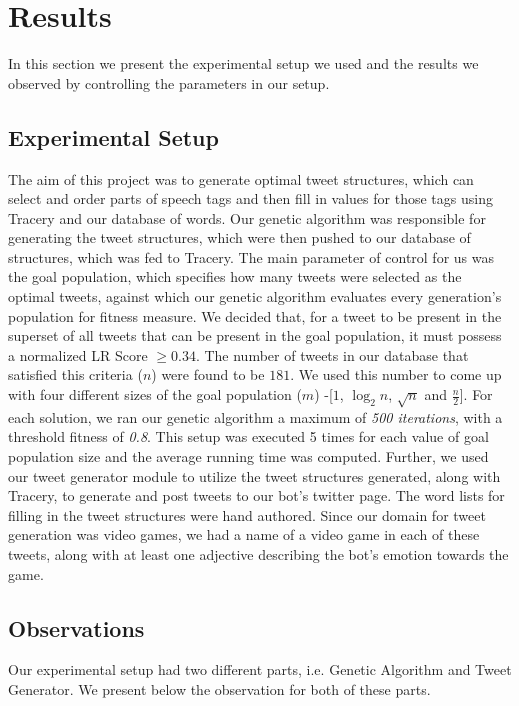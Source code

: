 \section{Results}
In this section we present the experimental setup we used and the results we observed by controlling the parameters in our setup.

\subsection{Experimental Setup}
The aim of this project was to generate optimal tweet structures, which can select and order parts of speech tags and then fill in values for those tags using Tracery and our database of words. Our genetic algorithm was responsible for generating the tweet structures, which were then pushed to our database of structures, which was fed to Tracery. The main parameter of control for us was the goal population, which specifies how many tweets were selected as the optimal tweets, against which our genetic algorithm evaluates every generation's population for fitness measure. We decided that, for a tweet to be present in the superset of all tweets that can be present in the goal population, it must possess a normalized LR Score $\geq 0.34$. The number of tweets in our database that satisfied this criteria ($n$) were found to be $181$. We used this number to come up with four different sizes of the goal population ($m$) -[$1$, $\log_2 n$, $\sqrt{n}$ and $\frac{n}{2}$]. For each solution, we ran our genetic algorithm a maximum of \textit{500 iterations}, with a threshold fitness of \textit{0.8}. This setup was executed 5 times for each value of goal population size and the average running time was computed.
Further, we used our tweet generator module to utilize the tweet structures generated, along with Tracery, to generate and post tweets to our bot's twitter page. The word lists for filling in the tweet structures were hand authored. Since our domain for tweet generation was video games, we had a name of a video game in each of these tweets, along with at least one adjective describing the bot's emotion towards the game.

\subsection{Observations}
Our experimental setup had two different parts, i.e. Genetic Algorithm and Tweet Generator. We present below the observation for both of these parts.


